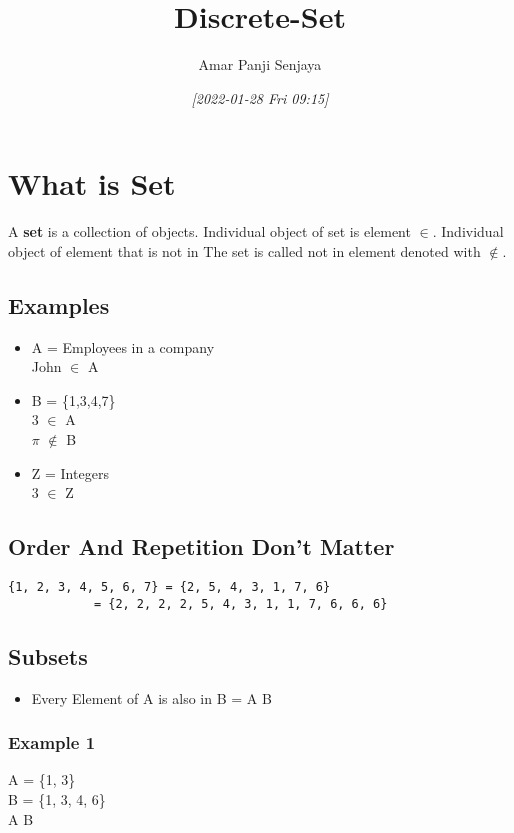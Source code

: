 \documentclass[11pt]{article}
\author{Amar Panji Senjaya}
\date{\textit{[2022-01-28 Fri 09:15]}}
\title{Discrete-Set}
\begin{document}
\maketitle
\setlength\parindent{0pt}
\newpage

\section{What is Set}
\label{sec:orge84a5b3}
A \textbf{set} is a collection of objects. Individual object of set is element \(\in\). Individual object of element that is not in The set is  called not in element denoted with \(\notin\).\\
\subsection{Examples}
\label{sec:org885b229}
\begin{itemize}
\item A = Employees in a company\\
John \(\in\) A\\
\item B = \{1,3,4,7\}\\
3 \(\in\) A\\
\(\pi\) \(\notin\) B\\
\item Z = Integers\\
3 \(\in\) Z\\
\end{itemize}

\subsection{Order And Repetition Don't Matter}
\label{sec:org5867a76}
\begin{verbatim}
{1, 2, 3, 4, 5, 6, 7} = {2, 5, 4, 3, 1, 7, 6}
			= {2, 2, 2, 2, 5, 4, 3, 1, 1, 7, 6, 6, 6}
\end{verbatim}

\newpage

\subsection{Subsets}
\label{sec:org20d823d}
\begin{itemize}
\item Every Element of A is also in B = A \subseteq B\\
\end{itemize}
\subsubsection{Example 1}
\label{sec:orgf7fbae4}
A = \{1, 3\}\\
B = \{1, 3, 4, 6\}\\
A \subseteq B\\
\end{document}
